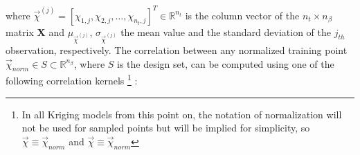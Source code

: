 \newpage

\vspace{1mm} 
where $\vec{χ}^{(j)} \!= \! [χ_{1,j}, χ_{2,j}, 
\hdots, χ_{n_{t},j} ]^{T} \! \in \! \mathbb{R}^{n_{t}}$ is the 
column vector of the $n_{t} \times n_{β}$ matrix $\mathbf{X}$ 
and $μ_{\vec{χ}^{(j)}}$, ${σ_{\vec{χ}^{(j)}}}$ the mean 
value and the standard deviation of the $j_{th}$ observation, 
respectively. The correlation between any normalized 
training point $\vec{{χ}}_{norm} \!\in \!S \!\subset \!\mathbb{R}
^{n_{β}}$, where $S$ is the design set, can be computed using one 
of the following correlation kernels \footnote{In all Kriging 
models from this point on, the notation of normalization will not 
be used for sampled points but will be implied for simplicity, so 
$\vec{χ} \equiv \vec{{χ}}_{norm}$ and $\vec{χ} \equiv \vec{{χ}}
_{norm}$} \cite{preprint_SMT,Matern}:

